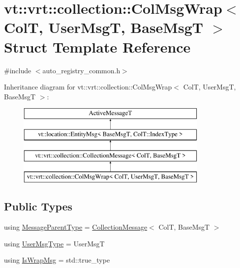 \hypertarget{structvt_1_1vrt_1_1collection_1_1_col_msg_wrap}{}\section{vt\+:\+:vrt\+:\+:collection\+:\+:Col\+Msg\+Wrap$<$ ColT, User\+MsgT, Base\+MsgT $>$ Struct Template Reference}
\label{structvt_1_1vrt_1_1collection_1_1_col_msg_wrap}


{\ttfamily \#include $<$auto\+\_\+registry\+\_\+common.\+h$>$}

Inheritance diagram for vt\+:\+:vrt\+:\+:collection\+:\+:Col\+Msg\+Wrap$<$ ColT, User\+MsgT, Base\+MsgT $>$\+:\begin{figure}[H]
\begin{center}
\leavevmode
\includegraphics[height=4.000000cm]{structvt_1_1vrt_1_1collection_1_1_col_msg_wrap}
\end{center}
\end{figure}
\subsection*{Public Types}
\begin{DoxyCompactItemize}
\item 
using \hyperlink{structvt_1_1vrt_1_1collection_1_1_col_msg_wrap_a51803f5a5355ade7dc2d1a46753ab4e9}{Message\+Parent\+Type} = \hyperlink{structvt_1_1vrt_1_1collection_1_1_collection_message}{Collection\+Message}$<$ ColT, Base\+MsgT $>$
\item 
using \hyperlink{structvt_1_1vrt_1_1collection_1_1_col_msg_wrap_a168446c6b2feea3a003dbfa02f21e227}{User\+Msg\+Type} = User\+MsgT
\item 
using \hyperlink{structvt_1_1vrt_1_1collection_1_1_col_msg_wrap_a788f0bead8cf9d8b5ed565b54d3c706a}{Is\+Wrap\+Msg} = std\+::true\+\_\+type
\end{DoxyCompactItemize}

